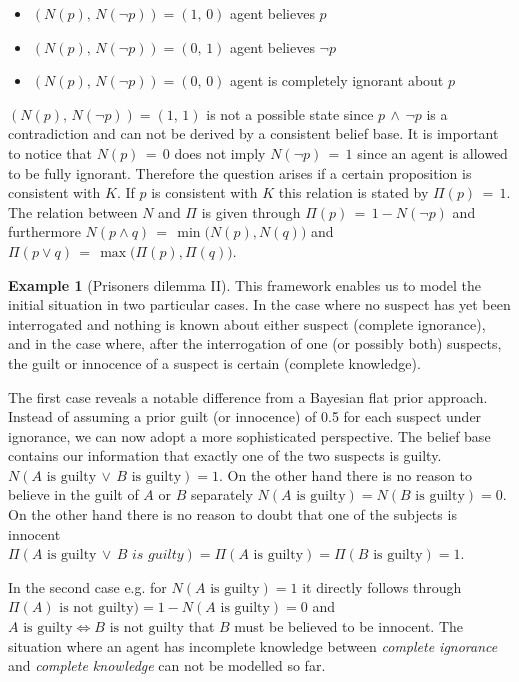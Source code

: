 \documentclass[
]{report}
\theoremstyle{definition}
\theoremstyle{definition}
\newtheorem{example}{Example}[section]
\begin{document}
\begin{itemize}
  \item $(N(p), \, N(\lnot p)) = (1, \, 0)$ agent believes $p$
  \item $(N(p), \, N(\lnot p)) = (0, \, 1)$ agent believes $\lnot p$
  \item $(N(p), \, N(\lnot p)) = (0, \, 0)$ agent is completely ignorant about $p$
\end{itemize}

\((N(p), \, N(\lnot p)) = (1, \, 1)\) is not a possible state since
\(p \, \land \, \lnot p\) is a contradiction and can not be derived by a
consistent belief base. It is important to notice that
\(N(p) \, = \, 0\) does not imply \(N( \lnot p) \, = \, 1\) since an
agent is allowed to be fully ignorant. Therefore the question arises if
a certain proposition is consistent with \(K\). If \(p\) is consistent
with \(K\) this relation is stated by \(\Pi (p) \, = \, 1\). The
relation between \(N\) and \(\Pi\) is given through
\(\Pi (p) \, = \, 1 - N(\lnot p)\) and furthermore
\(N (p \land q) \, = \, \min \big( N(p), N(q) \big)\) and
\(\Pi (p \lor q) \, = \, \max \big( \Pi(p), \Pi(q) \big)\).

\begin{example}[Prisoners dilemma II]
This framework enables us to model the initial situation in two particular cases. In the case where no suspect has yet been interrogated and nothing is known about either suspect (complete ignorance), and in the case where, after the interrogation of one (or possibly both) suspects, the guilt or innocence of a suspect is certain (complete knowledge).

The first case reveals a notable difference from a Bayesian flat prior approach. Instead of assuming a prior guilt (or innocence) of 0.5 for each suspect under ignorance, we can now adopt a more sophisticated perspective. The belief base contains our information that exactly one of the two suspects is guilty. $N(A \text{ is guilty} \, \lor \, B \text{ is guilty}) = 1$. On the other hand there is no reason to believe in the guilt of $A$ or $B$ separately $N(A \text{ is guilty}) = N(B \text{ is guilty}) = 0$. On the other hand there is no reason to doubt that one of the subjects is innocent $\Pi(A \text{ is guilty} \, \lor \, B \textit{ is guilty}) = \Pi (A \text{ is guilty}) = \Pi (B \text{ is guilty}) = 1$. 

In the second case e.g. for $N(A \text{ is guilty}) = 1$ it directly follows through $\Pi(A) \text{ is not guilty}) = 1 -  N(A \text{ is guilty}) = 0$ and $A \text{ is guilty} \Leftrightarrow B \text{ is not guilty}$ that $B$ must be believed to be innocent. The situation where an agent has incomplete knowledge between \textit{complete ignorance} and \textit{complete knowledge} can not be modelled so far.
\end{example}
\end{document}
